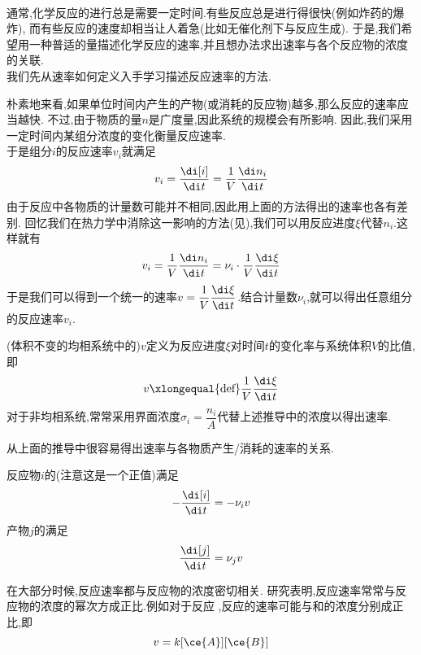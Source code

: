 \documentclass{ctexart}
\begin{document}
\pagestyle{plain}
\noindent{}\vspace{15pt}\\
\indent 通常,化学反应的进行总是需要一定时间.有些反应总是进行得很快(例如炸药的爆炸),%
而有些反应的速度却相当让人着急(比如无催化剂下与反应生成).%
于是,我们希望用一种普适的量描述化学反应的速率,并且想办法求出速率与各个反应物的浓度的关联.\vspace{12pt}\\
\indent 我们先从速率如何定义入手学习描述反应速率的方法.
\begin{derivation}
    朴素地来看,如果单位时间内产生的产物(或消耗的反应物)越多,那么反应的速率应当越快.%
    不过,由于物质的量$n$是广度量,因此系统的规模会有所影响.%
    因此,我们采用一定时间内某组分浓度的变化衡量反应速率.\\
    于是组分$i$的反应速率$v_i$就满足
    \[v_i=\dfrac{\di[i]}{\di t}=\dfrac{1}{V}\dfrac{\di n_i}{\di t}\]
    由于反应中各物质的计量数可能并不相同,因此用上面的方法得出的速率也各有差别.%
    回忆我们在热力学中消除这一影响的方法(见),我们可以用反应进度$\xi$代替$n_i$.这样就有
    \[v_i=\dfrac{1}{V}\dfrac{\di n_i}{\di t}=\nu_i\cdot\dfrac{1}{V}\dfrac{\di\xi}{\di t}\]
    于是我们可以得到一个统一的速率$v=\dfrac{1}{V}\dfrac{\di\xi}{\di t}$.结合计量数$\nu_i$,就可以得出任意组分的反应速率$v_i$.
\end{derivation}
\begin{definition}[7A.1.1 化学反应的速率]
    (体积不变的均相系统中的)$v$定义为反应进度$\xi$对时间$t$的变化率与系统体积$V$的比值,即
    \[v\xlongequal{\text{def}}\dfrac{1}{V}\dfrac{\di\xi}{\di t}\]
    对于非均相系统,常常采用界面浓度$\sigma_i=\dfrac{n_i}{A}$代替上述推导中的浓度以得出速率.
\end{definition}
从上面的推导中很容易得出速率与各物质产生/消耗的速率的关系.
\begin{theorem}
    反应物$i$的(注意这是一个正值)满足
    \[-\dfrac{\di[i]}{\di t}=-\nu_iv\]
    产物$j$的满足
    \[\dfrac{\di[j]}{\di t}=\nu_jv\]

\end{theorem}
\vspace{8pt}
\indent 在大部分时候,反应速率都与反应物的浓度密切相关.%
研究表明,反应速率常常与反应物的浓度的幂次方成正比.例如对于反应%
,反应的速率可能与和的浓度分别成正比,即
\[v=k[\ce{A}][\ce{B}]\]
\end{document}
